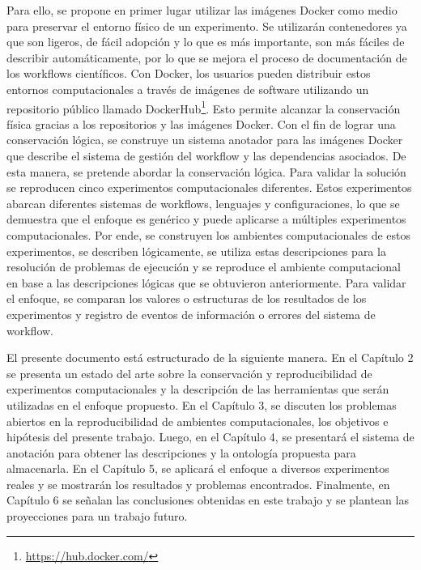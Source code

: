 Para ello, se propone en primer lugar utilizar las imágenes Docker como medio para preservar el entorno físico de un experimento. Se utilizarán contenedores ya que son ligeros, de fácil adopción y lo que es más importante, son más fáciles de describir automáticamente, por lo que se mejora el proceso de documentación de los workflows científicos.
Con Docker, los usuarios pueden distribuir estos entornos computacionales a través de imágenes de software utilizando un repositorio público llamado DockerHub\footnote{\url{https://hub.docker.com/}}. Esto permite alcanzar la conservación física gracias a los repositorios y las imágenes Docker.
Con el fin de lograr una conservación lógica, se construye un sistema anotador para las imágenes Docker que describe el sistema de gestión del workflow y las dependencias asociados. De esta manera, se pretende abordar la conservación lógica.
Para validar la solución se reproducen cinco experimentos computacionales diferentes. Estos experimentos abarcan diferentes sistemas de workflows, lenguajes y configuraciones, lo que se demuestra que el enfoque es genérico y puede aplicarse a múltiples experimentos computacionales.
Por ende, se construyen los ambientes computacionales de estos experimentos, se describen lógicamente, se utiliza estas descripciones para la resolución de problemas de ejecución y se reproduce el ambiente computacional en base a las descripciones lógicas que se obtuvieron anteriormente.
Para validar el enfoque, se comparan los valores o estructuras de los resultados de los experimentos y registro de eventos de información o errores del sistema de workflow.

El presente documento está estructurado de la siguiente manera. 
En el Capítulo 2 se presenta un estado del arte sobre la conservación y reproducibilidad de experimentos computacionales y la descripción de las herramientas que serán utilizadas en el enfoque propuesto.
En el Capítulo 3, se discuten los problemas abiertos en la reproducibilidad de ambientes computacionales, los objetivos e hipótesis del presente trabajo.
Luego, en el Capítulo 4, se presentará el sistema de anotación para obtener las descripciones y la ontología propuesta para almacenarla.
En el Capítulo 5, se aplicará el enfoque a diversos experimentos reales y se mostrarán los resultados y problemas encontrados. 
Finalmente, en Capítulo 6 se señalan las conclusiones obtenidas en este trabajo y se plantean las proyecciones para un trabajo futuro.